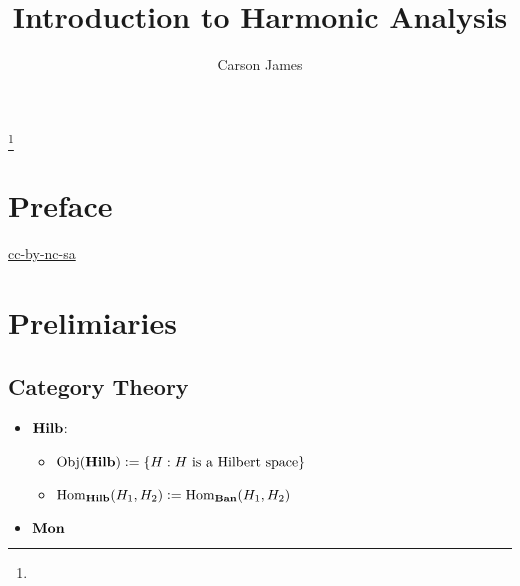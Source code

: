 \documentclass{book}
\begin{document}
	
	\frontmatter
	
	\title{Introduction to Harmonic Analysis}
	
	
	\author{Carson James}
	\thanks{}
	
	\date{}
	
	\maketitle
	
	
	\setcounter{page}{4}
	
	\tableofcontents
	\printunsrtglossary[type=symbols,style=long,title={Notation}]
	
	
	\mainmatter
	
	\chapter*{Preface}
	
	\begin{flushleft}
		\href{https://creativecommons.org/licenses/by-nc-sa/4.0/legalcode.txt}{cc-by-nc-sa}
	\end{flushleft}
	
	\newpage
	
	\chapter{Prelimiaries} 
	
	\section{Category Theory}
	
	\begin{itemize}
		\item $\operatorname*{\text{\textbf{Hilb}}}$:  
		\begin{itemize}
			\item $\operatorname{Obj}(\operatorname*{\text{\textbf{Hilb}}}) \vcentcolon= \{H: H \text{ is a Hilbert space}\}$
			\item $\operatorname{Hom}_{\operatorname*{\text{\textbf{Hilb}}}}(H_1, H_2) \vcentcolon= \operatorname{Hom}_{\operatorname*{\text{\textbf{Ban}}}}(H_1, H_2)$
		\end{itemize}
		\item $\operatorname*{\text{\textbf{Mon}}}$
	\end{itemize}
	
\end{document}

